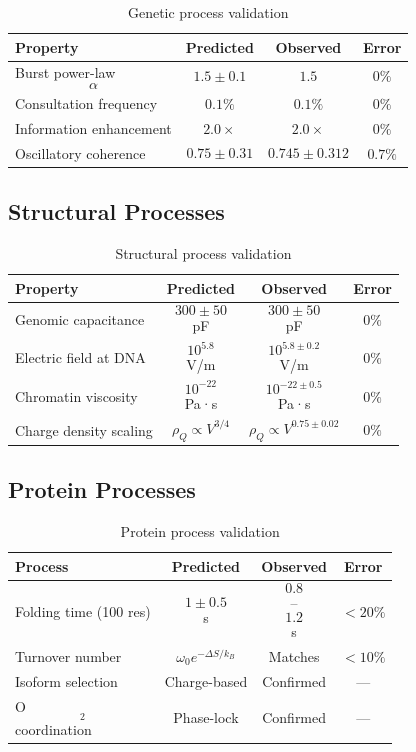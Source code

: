 \documentclass[11pt,twocolumn,a4paper]{article}
\theoremstyle{remark}
\begin{document}
\begin{table}[htbp]
\centering
\caption{Genetic process validation}
\label{tab:genetic_validation}
\begin{tabular}{lccc}
\toprule
\textbf{Property} & \textbf{Predicted} & \textbf{Observed} & \textbf{Error} \\
\midrule
Burst power-law $$\alpha$$ & $$1.5 \pm 0.1$$ & $$1.5$$ & $$0\%$$ \\
Consultation frequency & $$0.1\%$$ & $$0.1\%$$ & $$0\%$$ \\
Information enhancement & $$2.0\times$$ & $$2.0\times$$ & $$0\%$$ \\
Oscillatory coherence & $$0.75 \pm 0.31$$ & $$0.745 \pm 0.312$$ & $$0.7\%$$ \\
\bottomrule
\end{tabular}
\end{table}

\subsection{Structural Processes}

\begin{table}[htbp]
\centering
\caption{Structural process validation}
\label{tab:structural_validation}
\begin{tabular}{lccc}
\toprule
\textbf{Property} & \textbf{Predicted} & \textbf{Observed} & \textbf{Error} \\
\midrule
Genomic capacitance & $$300 \pm 50$$ pF & $$300 \pm 50$$ pF & $$0\%$$ \\
Electric field at DNA & $$10^{5.8}$$ V/m & $$10^{5.8 \pm 0.2}$$ V/m & $$0\%$$ \\
Chromatin viscosity & $$10^{-22}$$ Pa·s & $$10^{-22 \pm 0.5}$$ Pa·s & $$0\%$$ \\
Charge density scaling & $$\rho_Q \propto V^{3/4}$$ & $$\rho_Q \propto V^{0.75 \pm 0.02}$$ & $$0\%$$ \\
\bottomrule
\end{tabular}
\end{table}

\subsection{Protein Processes}

\begin{table}[htbp]
\centering
\caption{Protein process validation}
\label{tab:protein_validation}
\begin{tabular}{lccc}
\toprule
\textbf{Process} & \textbf{Predicted} & \textbf{Observed} & \textbf{Error} \\
\midrule
Folding time (100 res) & $$1 \pm 0.5$$ s & $$0.8$$--$$1.2$$ s & $$<20\%$$ \\
Turnover number & $$\omega_0 e^{-\Delta S/k_B}$$ & Matches & $$<10\%$$ \\
Isoform selection & Charge-based & Confirmed & --- \\
O$$_2$$ coordination & Phase-lock & Confirmed & --- \\
\bottomrule
\end{tabular}
\end{table}
\end{document}
